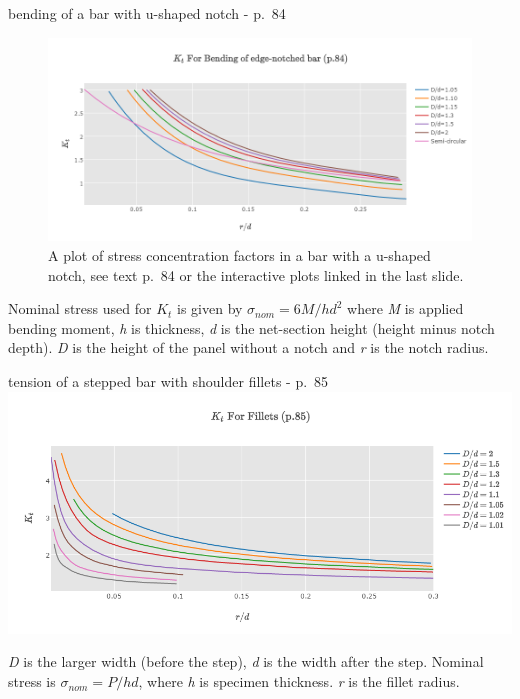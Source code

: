 \documentclass[
  letterpaper,
  ignorenonframetext,
  aspectratio=43,
  handout,
  12pt]{beamer}
\let\Oldincludegraphics\includegraphics
\renewcommand{\includegraphics}[2][]{\Oldincludegraphics[width=\textwidth,height=0.7\textheight,keepaspectratio]{#2}}
\begin{document}
\begin{frame}{bending of a bar with u-shaped notch - p.~84}
\protect\hypertarget{bending-of-a-bar-with-u-shaped-notch---p.-84}{}
\begin{figure}
\centering
\includegraphics{../images/kt-bending-edge.png}
\caption{A plot of stress concentration factors in a bar with a u-shaped
notch, see text p.~84 or the interactive plots linked in the last
slide.}
\end{figure}

Nominal stress used for \(K_t\) is given by \(\sigma_{nom} = 6M/hd^2\)
where \emph{M} is applied bending moment, \emph{h} is thickness,
\emph{d} is the net-section height (height minus notch depth). \emph{D}
is the height of the panel without a notch and \emph{r} is the notch
radius.
\end{frame}

\begin{frame}{tension of a stepped bar with shoulder fillets - p.~85}
\protect\hypertarget{tension-of-a-stepped-bar-with-shoulder-fillets---p.-85}{}
\includegraphics{../images/fillet.png}

\emph{D} is the larger width (before the step), \emph{d} is the width
after the step. Nominal stress is \(\sigma_{nom} = P/hd\), where
\emph{h} is specimen thickness. \emph{r} is the fillet radius.
\end{frame}
\end{document}
